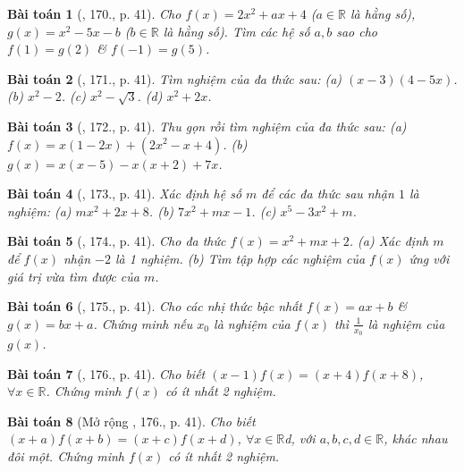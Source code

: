 \documentclass{article}
\newtheorem{baitoan}{Bài toán}
\begin{document}
\begin{baitoan}[\cite{Tuyen_Toan_7}, 170., p. 41]
	Cho $f(x) = 2x^2 + ax + 4$ ($a\in\mathbb{R}$ là hằng số), $g(x) = x^2 - 5x - b$ ($b\in\mathbb{R}$ là hằng số). Tìm các hệ số $a,b$ sao cho $f(1) = g(2)$ \& $f(-1) = g(5)$.
\end{baitoan}

\begin{baitoan}[\cite{Tuyen_Toan_7}, 171., p. 41]
	Tìm nghiệm của đa thức sau: (a) $(x - 3)(4 - 5x)$. (b) $x^2 - 2$. (c) $x^2 - \sqrt{3}$. (d) $x^2 + 2x$.
\end{baitoan}

\begin{baitoan}[\cite{Tuyen_Toan_7}, 172., p. 41]
	Thu gọn rồi tìm nghiệm của đa thức sau: (a) $f(x) = x(1 - 2x) + (2x^2 - x + 4)$. (b) $g(x) = x(x - 5) - x(x + 2) + 7x$.
\end{baitoan}

\begin{baitoan}[\cite{Tuyen_Toan_7}, 173., p. 41]
	Xác định hệ số $m$ để các đa thức sau nhận $1$ là nghiệm: (a) $mx^2 + 2x + 8$. (b) $7x^2 + mx - 1$. (c) $x^5 - 3x^2 + m$.
\end{baitoan}

\begin{baitoan}[\cite{Tuyen_Toan_7}, 174., p. 41]
	Cho đa thức $f(x) = x^2 + mx + 2$. (a) Xác định $m$ để $f(x)$ nhận $-2$ là 1 nghiệm. (b) Tìm tập hợp các nghiệm của $f(x)$ ứng với giá trị vừa tìm được của $m$.
\end{baitoan}

\begin{baitoan}[\cite{Tuyen_Toan_7}, 175., p. 41]
	Cho các nhị thức bậc nhất $f(x) = ax + b$ \& $g(x) = bx + a$. Chứng minh nếu $x_0$ là nghiệm của $f(x)$ thì $\frac{1}{x_0}$ là nghiệm của $g(x)$.
\end{baitoan}

\begin{baitoan}[\cite{Tuyen_Toan_7}, 176., p. 41]
	Cho biết $(x - 1)f(x) = (x + 4)f(x + 8)$, $\forall x\in\mathbb{R}$. Chứng minh $f(x)$ có ít nhất 2 nghiệm.
\end{baitoan}

\begin{baitoan}[Mở rộng \cite{Tuyen_Toan_7}, 176., p. 41]
	Cho biết $(x + a)f(x + b) = (x + c)f(x + d)$, $\forall x\in\mathbb{R}$d, với $a,b,c,d\in\mathbb{R}$, khác nhau đôi một. Chứng minh $f(x)$ có ít nhất 2 nghiệm.
\end{baitoan}

\end{document}
